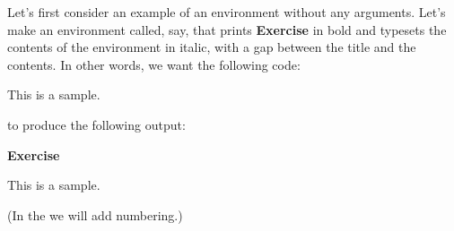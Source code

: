 
Let's first consider an example of an
environment without any arguments.  Let's make an environment called,
say,  that prints \textbf{Exercise} in bold and
typesets the contents of the environment in italic, with a gap
between the title and the contents.  In other words,
we want the following code:
\begin{code}
\newline
This is a sample.\newline
{}
\end{code}
to produce the following output:
\begin{result}
\par\noindent
\textbf{Exercise}
\begin{itshape}
\par
\vspace{\baselineskip}%
\noindent
This is a sample.
\end{itshape}
\end{result}
(In the  we will add numbering.)

